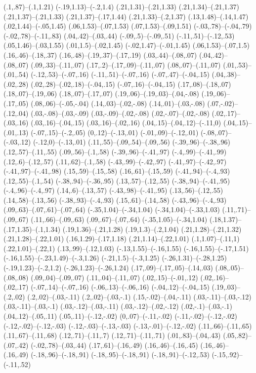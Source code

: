 {(.1,.87)--(.1,1.21) (-.19,1.13)--(-.2,1.4) (.21,1.31)--(.21,1.33) (.21,1.34)--(.21,1.37) (.21,1.37)--(.21,1.33) (.21,1.37)--(.17,1.44) (.21,1.33)--(.2,1.37) (.13,1.48)--(.14,1.47) (.02,1.44)--(-.05,1.45) (.06,1.53)--(.07,1.53) (.07,1.53)--(.09,1.51) (-.03,.78)--(-.04,.79) (-.02,.78)--(-.11,.83) (.04,.42)--(.03,.44) (-.09,.5)--(-.09,.51) (-.11,.51)--(-.12,.53) (.05,1.46)--(.03,1.55) (.01,1.5)--(.02,1.45) (-.02,1.47)--(-.01,1.45) (.06,1.53)--(.07,1.5) (.16,.46)--(.18,.37) (.16,.48)--(.19,.37)--(.17,.19) (.03,.44)--(.08,.07) (.04,.42)--(.08,.07) (.09,.33)--(.11,.07) (.17,.2)--(.17,.09)--(.11,.07) (.08,.07)--(.11,.07) (.01,.53)--(.01,.54) (-.12,.53)--(-.07,.16) (-.11,.51)--(-.07,.16) (-.07,.47)--(-.04,.15) (.04,.38)--(.02,.28) (.02,.28)--(.02,.18)--(-.04,.15) (-.07,.16)--(-.04,.15) (.17,.08)--(.18,.07) (.18,.07)--(.19,.06) (.18,.07)--(.17,.07) (.19,.06)--(.19,.03)--(.04,-.08) (.19,.06)--(.17,.05) (.08,.06)--(-.05,-.04) (.14,.03)--(.02,-.08) (.14,.01)--(.03,-.08) (.07,-.02)--(.12,.04) (.03,-.08)--(.03,-.09) (.03,-.09)--(.02,-.08) (.02,-.07)--(.02,-.08) (.02,.17)--(.03,.16) (.03,.16)--(.04,.15) (.03,.16)--(.02,.16) (.04,.15)--(.04,.12)--(-.11,0) (.04,.15)--(.01,.13) (-.07,.15)--(-.2,.05) (0,.12)--(-.13,.01) (-.01,.09)--(-.12,.01) (-.08,.07)--(-.03,.12) (-.12,0)--(-.13,.01) (.11,.55)--(.09,.54)--(.09,.56) (-.39,.96)--(-.38,.96) (.12,.57)--(.11,.55) (.09,.56)--(.1,.58) (-.39,.96)--(-.41,.97) (-.4,.99)--(-.41,.99) (.12,.6)--(.12,.57) (.11,.62)--(.1,.58) (-.43,.99)--(-.42,.97) (-.41,.97)--(-.42,.97) (-.41,.97)--(-.41,.98) (.15,.59)--(.15,.58) (.16,.61)--(.15,.59) (-.41,.94)--(-.4,.93) (.12,.55)--(.1,.54) (-.38,.94)--(-.36,.95) (.13,.57)--(.12,.55) (-.38,.94)--(-.41,.95) (-.4,.96)--(-.4,.97) (.14,.6)--(.13,.57) (-.43,.98)--(-.41,.95) (.13,.56)--(.12,.55) (.14,.58)--(.13,.56) (-.38,.93)--(-.4,.93) (.15,.61)--(.14,.58) (-.43,.96)--(-.4,.93) (.09,.63)--(.07,.61)--(.07,.64) (-.35,1.04)--(-.34,1.04) (-.34,1.04)--(-.33,1.03) (.11,.71)--(.09,.67) (.11,.66)--(.09,.63) (.09,.67)--(.07,.64) (-.35,1.05)--(-.34,1.04) (.18,1.37)--(.17,1.35)--(.1,1.34) (.19,1.36)--(.21,1.28) (.19,1.3)--(.2,1.04) (.21,1.28)--(.21,1.32) (.21,1.28)--(.22,1.01) (.16,1.29)--(.17,1.18) (.21,1.14)--(.22,1.01) (.1,1.07)--(.11,1) (.22,1.01)--(.22,1) (.13,.99)--(.12,1.03) (-.13,1.55)--(-.16,1.55) (-.16,1.55)--(-.17,1.51) (-.16,1.55)--(-.23,1.49)--(-.3,1.26) (-.21,1.5)--(-.3,1.25) (-.26,1.31)--(-.28,1.25) (-.19,1.23)--(-.2,1.2) (-.26,1.23)--(-.26,1.24) (.17,.09)--(.17,.05)--(.14,.03) (.08,.05)--(.08,.08) (.09,.04)--(.09,.07) (.11,.04)--(.11,.07) (.02,.15)--(-.01,.12) (.02,.16)--(.02,.17) (-.07,.14)--(-.07,.16) (-.06,.13)--(-.06,.16) (-.04,.12)--(-.04,.15) (.19,.03)--(.2,.02) (.2,.02)--(.03,-.11) (.2,.02)--(.03,-.1) (.15,-.02)--(.04,-.11) (.03,-.11)--(.03,-.12) (.03,-.11)--(.03,-.1) (.03,-.12)--(.03,-.11) (.03,-.12)--(.02,-.12) (.02,-.1)--(.03,-.1) (.04,.12)--(.05,.11) (.05,.11)--(-.12,-.02) (0,.07)--(-.11,-.02) (-.11,-.02)--(-.12,-.02) (-.12,-.02)--(-.12,-.03) (-.12,-.03)--(-.13,-.03) (-.13,-.01)--(-.12,-.02) (.11,.66)--(.11,.65) (.11,.67)--(.11,.68) (.12,.71)--(.11,.7) (.12,.71)--(.11,.71) (.01,.83)--(.04,.43) (.05,.82)--(.07,.42) (-.02,.78)--(.03,.44) (.17,.61)--(.16,.49) (.16,.46)--(.16,.45) (.16,.46)--(.16,.49) (-.18,.96)--(-.18,.91) (-.18,.95)--(-.18,.91) (-.18,.91)--(-.12,.53) (-.15,.92)--(-.11,.52) }

